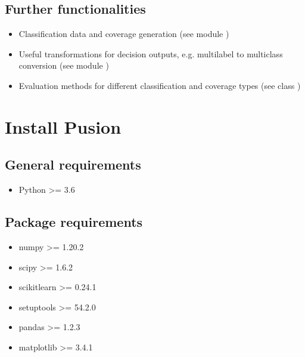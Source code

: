 \documentclass[letterpaper,10pt,english]{sphinxmanual}
\begin{document}
\section{Further functionalities}
\label{\detokenize{overview:further-functionalities}}\begin{itemize}
\item {} 
\sphinxAtStartPar
Classification data and coverage generation (see module {\hyperref[\detokenize{pusion.util.generator:generator-cref}]{}})

\item {} 
\sphinxAtStartPar
Useful transformations for decision outputs, e.g. multilabel to multiclass conversion
(see module {\hyperref[\detokenize{pusion.util.transformer:transformer-cref}]{}})

\item {} 
\sphinxAtStartPar
Evaluation methods for different classification and coverage types (see class {\hyperref[\detokenize{pusion.evaluation.evaluation:eval-cref}]{}})

\end{itemize}


\chapter{Install Pusion}
\label{\detokenize{install:install-pusion}}\label{\detokenize{install::doc}}

\section{General requirements}
\label{\detokenize{install:general-requirements}}\begin{itemize}
\item {} 
\sphinxAtStartPar
Python \textgreater{}= 3.6

\end{itemize}


\section{Package requirements}
\label{\detokenize{install:package-requirements}}\begin{itemize}
\item {} 
\sphinxAtStartPar
numpy \textgreater{}= 1.20.2

\item {} 
\sphinxAtStartPar
scipy \textgreater{}= 1.6.2

\item {} 
\sphinxAtStartPar
scikit\sphinxhyphen{}learn \textgreater{}= 0.24.1

\item {} 
\sphinxAtStartPar
setuptools \textgreater{}= 54.2.0

\item {} 
\sphinxAtStartPar
pandas \textgreater{}= 1.2.3

\item {} 
\sphinxAtStartPar
matplotlib \textgreater{}= 3.4.1

\end{itemize}
\end{document}

